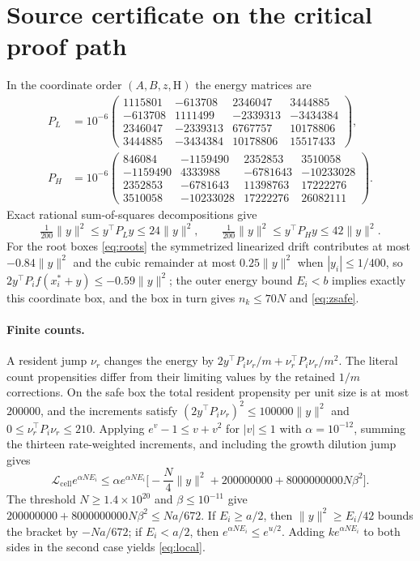 \documentclass[11pt,a4paper]{article}
\theoremstyle{plain}
\theoremstyle{definition}
\theoremstyle{remark}
\newcommand{\cL}{\mathcal L}
\newcommand{\Hs}{\mathrm H}
\begin{document}
\section{Source certificate on the critical proof path}\label{app:cert}
In the coordinate order $(A,B,z,\Hs)$ the energy matrices are
\begin{align*}
P_L&=10^{-6}\begin{pmatrix}
1115801&-613708&2346047&3444885\\
-613708&1111499&-2339313&-3434384\\
2346047&-2339313&6767757&10178806\\
3444885&-3434384&10178806&15517433
\end{pmatrix},\\[4pt]
P_H&=10^{-6}\begin{pmatrix}
846084&-1159490&2352853&3510058\\
-1159490&4333988&-6781643&-10233028\\
2352853&-6781643&11398763&17222276\\
3510058&-10233028&17222276&26082111
\end{pmatrix}.
\end{align*}
Exact rational sum-of-squares decompositions give
\[
\tfrac1{200}\|y\|^2\leq y^{\!\top}P_Ly\leq24\|y\|^2,\qquad \tfrac1{200}\|y\|^2\leq y^{\!\top}P_Hy\leq42\|y\|^2 .
\]
For the root boxes \eqref{eq:roots} the symmetrized linearized drift contributes at most $-0.84\|y\|^2$ and the cubic remainder at most $0.25\|y\|^2$ when $|y_i|\leq1/400$, so $2y^{\!\top}P_if(x_i^*+y)\leq-0.59\|y\|^2$; the outer energy bound $E_i<b$ implies exactly this coordinate box, and the box in turn gives $n_k\leq70N$ and \eqref{eq:zsafe}.

\paragraph{Finite counts.}
A resident jump $\nu_r$ changes the energy by $2y^{\!\top}P_i\nu_r/m+\nu_r^{\!\top}P_i\nu_r/m^2$. The literal count propensities differ from their limiting values by the retained $1/m$ corrections. On the safe box the total resident propensity per unit size is at most $200000$, and the increments satisfy $(2y^{\!\top}P_i\nu_r)^2\leq100000\|y\|^2$ and $0\leq\nu_r^{\!\top}P_i\nu_r\leq210$. Applying $e^{v}-1\leq v+v^2$ for $|v|\leq1$ with $\alpha=10^{-12}$, summing the thirteen rate-weighted increments, and including the growth dilution jump gives
\begin{equation}\label{eq:preaffine}
\cL_{\mathrm{cell}}e^{\alpha NE_i}\leq\alpha e^{\alpha NE_i}\Big[-\frac N4\|y\|^2+200000000+8000000000N\beta^2\Big].
\end{equation}
The threshold $N\geq1.4\times10^{20}$ and $\beta\leq10^{-11}$ give $200000000+8000000000N\beta^2\leq Na/672$. If $E_i\geq a/2$, then $\|y\|^2\geq E_i/42$ bounds the bracket by $-Na/672$; if $E_i<a/2$, then $e^{\alpha NE_i}\leq e^{u/2}$. Adding $ke^{\alpha NE_i}$ to both sides in the second case yields \eqref{eq:local}.
\end{document}

